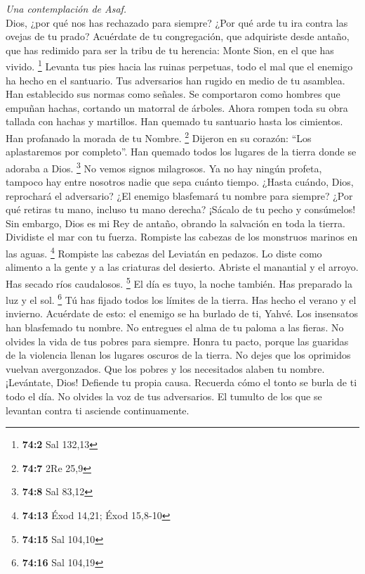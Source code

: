 \begin{paracol}{2}
\emph{Una contemplación de Asaf.}\\
 Dios, ¿por qué nos has rechazado para siempre? ¿Por qué
arde tu ira contra las ovejas de tu prado?  Acuérdate de
tu congregación, que adquiriste desde antaño, que has redimido para ser
la tribu de tu herencia: Monte Sion, en el que has vivido. \footnote{\textbf{74:2}
  Sal 132,13}  Levanta tus pies hacia las ruinas
perpetuas, todo el mal que el enemigo ha hecho en el santuario.
 Tus adversarios han rugido en medio de tu asamblea. Han
establecido sus normas como señales.  Se comportaron como
hombres que empuñan hachas, cortando un matorral de árboles.
 Ahora rompen toda su obra tallada con hachas y martillos.
 Han quemado tu santuario hasta los cimientos. Han
profanado la morada de tu Nombre. \footnote{\textbf{74:7} 2Re 25,9}
 Dijeron en su corazón: ``Los aplastaremos por completo''.
Han quemado todos los lugares de la tierra donde se adoraba a Dios.
\footnote{\textbf{74:8} Sal 83,12}  No vemos signos
milagrosos. Ya no hay ningún profeta, tampoco hay entre nosotros nadie
que sepa cuánto tiempo.  ¿Hasta cuándo, Dios, reprochará
el adversario? ¿El enemigo blasfemará tu nombre para siempre?
 ¿Por qué retiras tu mano, incluso tu mano derecha?
¡Sácalo de tu pecho y consúmelos!  Sin embargo, Dios es
mi Rey de antaño, obrando la salvación en toda la tierra.
 Dividiste el mar con tu fuerza. Rompiste las cabezas de
los monstruos marinos en las aguas. \footnote{\textbf{74:13} Éxod 14,21;
  Éxod 15,8-10}  Rompiste las cabezas del Leviatán en
pedazos. Lo diste como alimento a la gente y a las criaturas del
desierto.  Abriste el manantial y el arroyo. Has secado
ríos caudalosos. \footnote{\textbf{74:15} Sal 104,10}  El
día es tuyo, la noche también. Has preparado la luz y el sol.
\footnote{\textbf{74:16} Sal 104,19}  Tú has fijado todos
los límites de la tierra. Has hecho el verano y el invierno.
 Acuérdate de esto: el enemigo se ha burlado de ti,
Yahvé. Los insensatos han blasfemado tu nombre.  No
entregues el alma de tu paloma a las fieras. No olvides la vida de tus
pobres para siempre.  Honra tu pacto, porque las guaridas
de la violencia llenan los lugares oscuros de la tierra. 
No dejes que los oprimidos vuelvan avergonzados. Que los pobres y los
necesitados alaben tu nombre.  ¡Levántate, Dios! Defiende
tu propia causa. Recuerda cómo el tonto se burla de ti todo el día.
 No olvides la voz de tus adversarios. El tumulto de los
que se levantan contra ti asciende continuamente.


\end{paracol}
